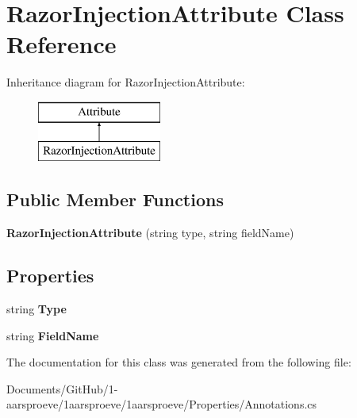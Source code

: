 \hypertarget{class_razor_injection_attribute}{}\section{Razor\+Injection\+Attribute Class Reference}
\label{class_razor_injection_attribute}
Inheritance diagram for Razor\+Injection\+Attribute\+:\begin{figure}[H]
\begin{center}
\leavevmode
\includegraphics[height=2.000000cm]{class_razor_injection_attribute}
\end{center}
\end{figure}
\subsection*{Public Member Functions}
\begin{DoxyCompactItemize}
\item 
\hypertarget{class_razor_injection_attribute_a16b318ef8474449bae084dbe8377d77e}{}{\bfseries Razor\+Injection\+Attribute} (string type, string field\+Name)\label{class_razor_injection_attribute_a16b318ef8474449bae084dbe8377d77e}

\end{DoxyCompactItemize}
\subsection*{Properties}
\begin{DoxyCompactItemize}
\item 
\hypertarget{class_razor_injection_attribute_a03ab3ec12db49f3eeca9d462b95bb6fd}{}string {\bfseries Type}\label{class_razor_injection_attribute_a03ab3ec12db49f3eeca9d462b95bb6fd}

\item 
\hypertarget{class_razor_injection_attribute_ace7a81f227c76db0a47cca6edb85a911}{}string {\bfseries Field\+Name}\label{class_razor_injection_attribute_ace7a81f227c76db0a47cca6edb85a911}

\end{DoxyCompactItemize}


The documentation for this class was generated from the following file\+:\begin{DoxyCompactItemize}
\item 
Documents/\+Git\+Hub/1-\/aarsproeve/1aarsproeve/1aarsproeve/\+Properties/Annotations.\+cs\end{DoxyCompactItemize}
